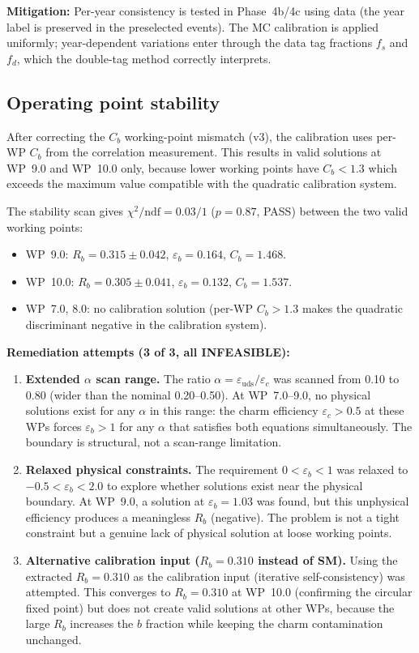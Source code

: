 \documentclass[11pt,a4paper]{article}
\begin{document}
\textbf{Mitigation:} Per-year consistency is tested in Phase~4b/4c using data (the
year label is preserved in the preselected events). The MC calibration is applied
uniformly; year-dependent variations enter through the data tag fractions $f_s$ and
$f_d$, which the double-tag method correctly interprets.

\subsection{Operating point stability}

After correcting the $C_b$ working-point mismatch (v3), the calibration uses per-WP $C_b$
from the correlation measurement. This results in valid solutions at WP~9.0 and WP~10.0
only, because lower working points have $C_b < 1.3$ which exceeds the maximum value
compatible with the quadratic calibration system.

The stability scan gives $\chi^2/\mathrm{ndf} = 0.03/1$ ($p = 0.87$, PASS) between
the two valid working points:
\begin{itemize}
\item WP~9.0: $R_b = 0.315 \pm 0.042$, $\varepsilon_b = 0.164$, $C_b = 1.468$.
\item WP~10.0: $R_b = 0.305 \pm 0.041$, $\varepsilon_b = 0.132$, $C_b = 1.537$.
\item WP~7.0, 8.0: no calibration solution (per-WP $C_b > 1.3$ makes the quadratic
discriminant negative in the calibration system).
\end{itemize}

\textbf{Remediation attempts (3 of 3, all INFEASIBLE):}

\begin{enumerate}
\item \textbf{Extended $\alpha$ scan range.} The ratio
$\alpha = \varepsilon_\mathrm{uds}/\varepsilon_c$ was scanned from 0.10 to 0.80
(wider than the nominal 0.20--0.50). At WP~7.0--9.0, no physical solutions exist for
any $\alpha$ in this range: the charm efficiency $\varepsilon_c > 0.5$ at these WPs
forces $\varepsilon_b > 1$ for any $\alpha$ that satisfies both equations
simultaneously. The boundary is structural, not a scan-range limitation.

\item \textbf{Relaxed physical constraints.} The requirement
$0 < \varepsilon_b < 1$ was relaxed to $-0.5 < \varepsilon_b < 2.0$ to explore
whether solutions exist near the physical boundary. At WP~9.0, a solution at
$\varepsilon_b = 1.03$ was found, but this unphysical efficiency produces a
meaningless $R_b$ (negative). The problem is not a tight constraint but a genuine
lack of physical solution at loose working points.

\item \textbf{Alternative calibration input ($R_b = 0.310$ instead of SM).}
Using the extracted $R_b = 0.310$ as the calibration input (iterative self-consistency)
was attempted. This converges to $R_b = 0.310$ at WP~10.0 (confirming the circular
fixed point) but does not create valid solutions at other WPs, because the large
$R_b$ increases the $b$ fraction while keeping the charm contamination unchanged.
\end{enumerate}
\end{document}

